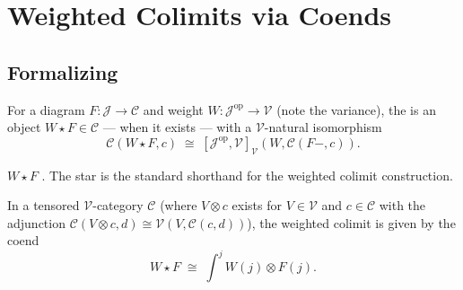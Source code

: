 \section{Weighted Colimits via Coends}
\label{sec:wcolim-coend}

\subsection{Formalizing}

\begin{definition}
\label{def:weighted-colimit}
For a diagram $F : \mathcal{J} \to \mathcal{C}$ and weight $W :
\mathcal{J}^{\mathrm{op}} \to \mathcal{V}$ (note the variance), the
 is an object $W \star F \in \mathcal{C}$ — when it
exists — with a $\mathcal{V}$-natural isomorphism
\begin{equation*}
  \mathcal{C}(W \star F, c) \;\cong\; [\mathcal{J}^{\mathrm{op}}, \mathcal{V}]_\mathcal{V}(W,
  \mathcal{C}(F-, c)).
\end{equation*}
\end{definition}

\begin{howtosay}
$W \star F$ . The star is the standard
shorthand for the weighted colimit construction.
\end{howtosay}

\begin{theorem}
\label{thm:wcolim-coend-formula}
In a tensored $\mathcal{V}$-category $\mathcal{C}$ (where $V \otimes c$ exists
for $V \in \mathcal{V}$ and $c \in \mathcal{C}$ with the adjunction
$\mathcal{C}(V \otimes c, d) \cong \mathcal{V}(V, \mathcal{C}(c, d))$), the
weighted colimit is given by the coend
\begin{equation*}
  W \star F \;\cong\; \int^{j} W(j) \otimes F(j).
\end{equation*}
\end{theorem}

